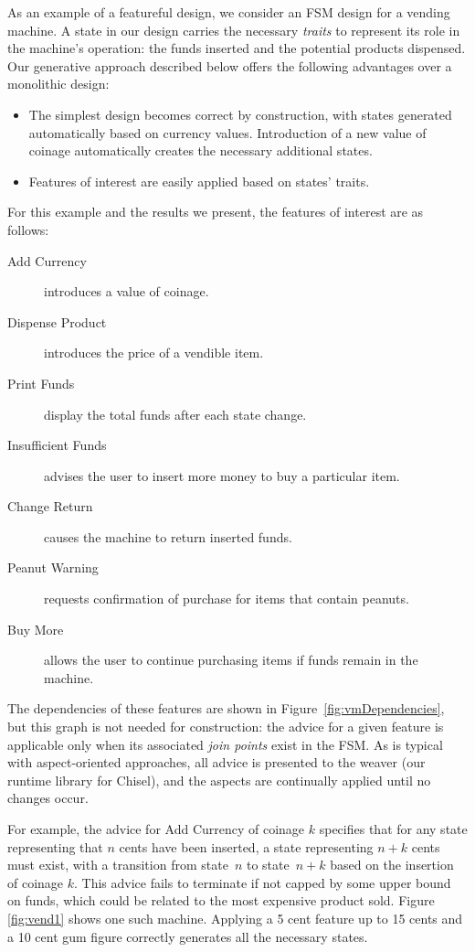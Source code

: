 \documentclass[sigplan,anonymous,review]{acmart}
\begin{document}
As an example of a featureful design, we consider an FSM design for a vending machine.   A state in our design carries the necessary \emph{traits} to represent its role in the machine's operation:  the funds inserted and the potential products dispensed.  Our generative approach described below offers the following advantages over a monolithic design:
\begin{itemize}
    \item The simplest design becomes correct by construction, with states generated automatically based on currency values.  Introduction of a new value of coinage automatically creates the necessary additional states.
    \item Features of interest are easily applied based on states' traits.
\end{itemize}
For this example and the results we present, the features of interest are as follows:
\begin{description}
    \item[Add Currency] introduces a value of coinage.
    \item[Dispense Product] introduces the price of a vendible item.
    \item[Print Funds] display the total funds after each state change.
    \item[Insufficient Funds] advises the user to insert more money to buy a particular item.
    \item[Change Return] causes the machine to return inserted funds.
    \item[Peanut Warning] requests confirmation of purchase for items that contain peanuts.
    \item[Buy More] allows the user to continue purchasing items if funds remain in the machine.
\end{description}
The dependencies of these features are shown in Figure~\ref{fig:vmDependencies}, but this graph is not needed for construction:  the advice for a given feature is applicable only when its associated \emph{join points} exist in the FSM.  As is typical with aspect-oriented approaches, all advice is presented to the weaver (our runtime library for Chisel), and the aspects are continually applied until no changes occur.

For example, the advice for Add Currency of coinage $k$ specifies that for any state representing that $n$ cents have been inserted, a state representing $n+k$ cents must exist, with a transition from state~$n$ to state~$n+k$ based on the insertion of coinage $k$.   This advice fails to terminate if not capped by some upper bound on funds, which could be related to the most expensive product sold. Figure \ref{fig:vend1} shows one such machine. Applying a 5 cent feature up to 15 cents and a 10 cent gum figure correctly generates all the necessary states. 
\end{document}
